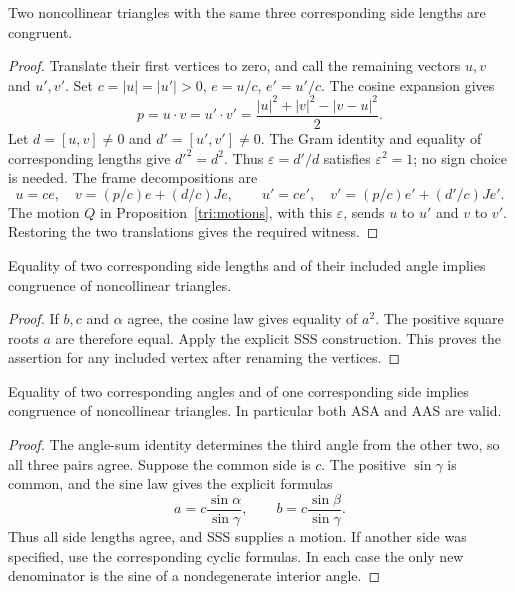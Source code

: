 \begin{theorem}
\label{tri:sss}
Two noncollinear triangles with the same three corresponding side lengths
are congruent.
\end{theorem}
\begin{proof}
Translate their first vertices to zero, and call the remaining vectors
$u,v$ and $u',v'$.  Set $c=|u|=|u'|>0$, $e=u/c$, $e'=u'/c$.
The cosine expansion gives
\[
 p=u\mathbin{\cdot}v=u'\mathbin{\cdot}v'
   =\frac{|u|^2+|v|^2-|v-u|^2}{2}.
\]
Let $d=[u,v]\ne0$ and $d'=[u',v']\ne0$.  The Gram identity and equality
of corresponding lengths give $d'^2=d^2$.  Thus
$\varepsilon=d'/d$ satisfies $\varepsilon^2=1$; no sign choice is needed.
The frame decompositions are
\[
 u=ce,\quad v=(p/c)e+(d/c)Je,\qquad
 u'=ce',\quad v'=(p/c)e'+(d'/c)Je'.
\]
The motion $Q$ in Proposition~\ref{tri:motions}, with this $\varepsilon$,
sends $u$ to $u'$ and $v$ to $v'$.  Restoring the two translations gives
the required witness.
\end{proof}

\begin{theorem}
\label{tri:sas}
Equality of two corresponding side lengths and of their included angle
implies congruence of noncollinear triangles.
\end{theorem}
\begin{proof}
If $b,c$ and $\alpha$ agree, the cosine law gives equality of $a^2$.
The positive square roots $a$ are therefore equal.  Apply the explicit SSS
construction.  This proves the assertion for any included vertex after
renaming the vertices.
\end{proof}

\begin{theorem}
\label{tri:asa}
Equality of two corresponding angles and of one corresponding side implies
congruence of noncollinear triangles.  In particular both ASA and AAS are
valid.
\end{theorem}
\begin{proof}
The angle-sum identity determines the third angle from the other two, so
all three pairs agree.  Suppose the common side is $c$.  The positive
$\sin\gamma$ is common, and the sine law gives the explicit formulas
\[
 a=c\frac{\sin\alpha}{\sin\gamma},\qquad
 b=c\frac{\sin\beta}{\sin\gamma}.
\]
Thus all side lengths agree, and SSS supplies a motion.  If another side
was specified, use the corresponding cyclic formulas.  In each case the
only new denominator is the sine of a nondegenerate interior angle.
\end{proof}

